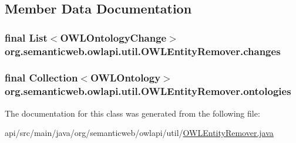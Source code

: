\subsection{Member Data Documentation}
\hypertarget{classorg_1_1semanticweb_1_1owlapi_1_1util_1_1_o_w_l_entity_remover_a4e0ce7551f3bbefe7f96f1681503c12f}{
\subsubsection[{changes}]{\setlength{\rightskip}{0pt plus 5cm}final List$<${\bf O\-W\-L\-Ontology\-Change}$>$ org.\-semanticweb.\-owlapi.\-util.\-O\-W\-L\-Entity\-Remover.\-changes\hspace{0.3cm}{\ttfamily [private]}}}\label{classorg_1_1semanticweb_1_1owlapi_1_1util_1_1_o_w_l_entity_remover_a4e0ce7551f3bbefe7f96f1681503c12f}
\hypertarget{classorg_1_1semanticweb_1_1owlapi_1_1util_1_1_o_w_l_entity_remover_a49abe27183ac14719a0def399db5981c}{
\subsubsection[{ontologies}]{\setlength{\rightskip}{0pt plus 5cm}final Collection$<${\bf O\-W\-L\-Ontology}$>$ org.\-semanticweb.\-owlapi.\-util.\-O\-W\-L\-Entity\-Remover.\-ontologies\hspace{0.3cm}{\ttfamily [private]}}}\label{classorg_1_1semanticweb_1_1owlapi_1_1util_1_1_o_w_l_entity_remover_a49abe27183ac14719a0def399db5981c}


The documentation for this class was generated from the following file\-:\begin{DoxyCompactItemize}
\item 
api/src/main/java/org/semanticweb/owlapi/util/\hyperlink{_o_w_l_entity_remover_8java}{O\-W\-L\-Entity\-Remover.\-java}\end{DoxyCompactItemize}
